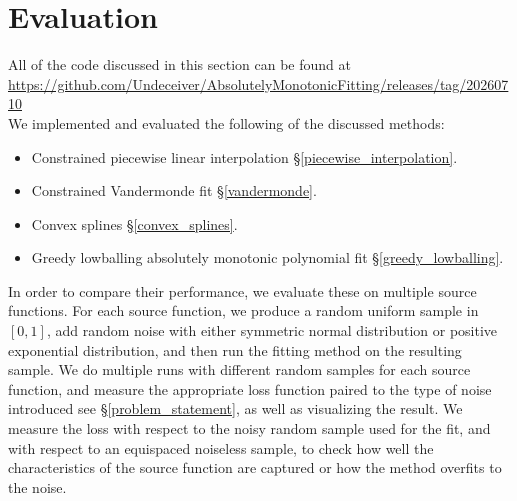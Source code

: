 \documentclass[12pt,a4paper]{article}
\begin{document}
\section{Evaluation}
\label{evaluation}

All of the code discussed in this section can be found at \url{https://github.com/Undeceiver/AbsolutelyMonotonicFitting/releases/tag/20260710}\\

We implemented and evaluated the following of the discussed methods:
\begin{itemize}
\item Constrained piecewise linear interpolation \S \ref{piecewise_interpolation}.
\item Constrained Vandermonde fit \S \ref{vandermonde}.
\item Convex splines \S \ref{convex_splines}.
\item Greedy lowballing absolutely monotonic polynomial fit \S \ref{greedy_lowballing}.
\end{itemize}

In order to compare their performance, we evaluate these on multiple source functions. For each source function, we produce a random uniform sample in $[0,1]$, add random noise with either symmetric normal distribution or positive exponential distribution, and then run the fitting method on the resulting sample. We do multiple runs with different random samples for each source function, and measure the appropriate loss function paired to the type of noise introduced see \S \ref{problem_statement}, as well as visualizing the result. We measure the loss with respect to the noisy random sample used for the fit, and with respect to an equispaced noiseless sample, to check how well the characteristics of the source function are captured or how the method overfits to the noise.\\
\end{document}

